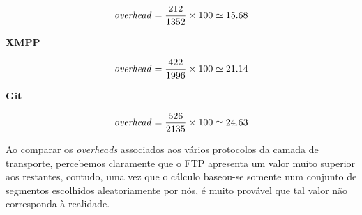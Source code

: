     \[
      \text{\textit{overhead}} 
      = \dfrac
        {212}
        {1352}
        \times 100
    \simeq 15.68
    \]

    \textbf{\large XMPP}
    \vspace{-15pt}

    \[
      \text{\textit{overhead}} 
      = \dfrac
        {422}
        {1996}
        \times 100
    \simeq 21.14
    \]

    \textbf{\large Git}
    \vspace{-15pt}

    \[
      \text{\textit{overhead}} 
      = \dfrac
        {526}
        {2135}
        \times 100
    \simeq 24.63
    \]
    

    
    \vspace{5pt}
    Ao comparar os \textit{overheads} associados aos vários protocolos da camada de transporte, percebemos claramente que o FTP apresenta um valor muito superior aos restantes, contudo, uma vez que o cálculo baseou-se somente num conjunto de segmentos escolhidos aleatoriamente por nós, é muito provável que tal valor não corresponda à realidade.
